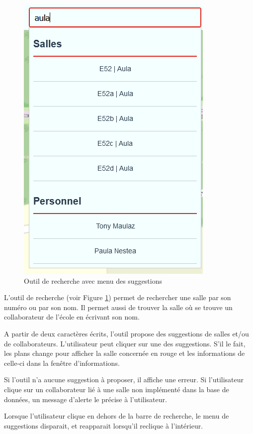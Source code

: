 \documentclass[
    iai, %
    il, %
]{heig-tb}
\begin{document}
\begin{figure}[h]
    \centering
    \includegraphics[scale=0.5]{frontend-recherche.png}
    \caption{Outil de recherche avec menu des suggestions}
    \label{fig:recherche}
\end{figure}


L'outil de recherche (voir Figure \ref{fig:recherche}) permet de rechercher une salle par son numéro ou par son nom.
Il permet aussi de trouver la salle où se trouve un collaborateur de l'école en écrivant son nom.

A partir de deux caractères écrits, l'outil propose des suggestions de salles et/ou de collaborateurs.
L'utilisateur peut cliquer sur une des suggestions.
S'il le fait, les plans change pour afficher la salle concernée en rouge et les informations de celle-ci dans la fenêtre d'informations.

Si l'outil n'a aucune suggestion à proposer, il affiche une erreur.
Si l'utilisateur clique sur un collaborateur lié à une salle non implémenté dans la base de données,
un message d'alerte le précise à l'utilisateur.

Lorsque l'utilisateur clique en dehors de la barre de recherche, le menu de suggestions disparait,
et reapparait lorsqu'il reclique à l'intérieur.
\end{document}
